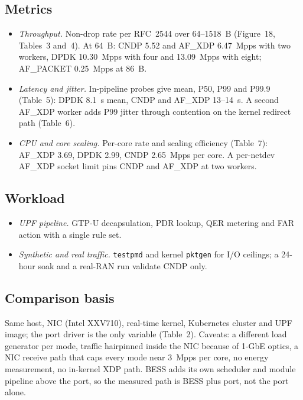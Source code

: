 \documentclass[11pt,a4paper]{article}
\begin{document}
\subsection*{\normalsize\normalfont Metrics}
\begin{itemize}
\setlength{\itemsep}{2pt}
\item \emph{Throughput.}
Non-drop rate per RFC~2544 over 64--1518~B (Figure~18, Tables~3 and~4).
At 64~B: CNDP 5.52 and AF\_XDP 6.47~Mpps with two workers, DPDK 10.30~Mpps with four and 13.09~Mpps with eight; AF\_PACKET 0.25~Mpps at 86~B.
\item \emph{Latency and jitter.}
In-pipeline probes give mean, P50, P99 and P99.9 (Table~5): DPDK 8.1~\textmu s mean, CNDP and AF\_XDP 13--14~\textmu s.
A second AF\_XDP worker adds P99 jitter through contention on the kernel redirect path (Table~6).
\item \emph{CPU and core scaling.}
Per-core rate and scaling efficiency (Table~7): AF\_XDP 3.69, DPDK 2.99, CNDP 2.65~Mpps per core.
A per-netdev AF\_XDP socket limit pins CNDP and AF\_XDP at two workers.
\end{itemize}

\subsection*{\normalsize\normalfont Workload}
\begin{itemize}
\setlength{\itemsep}{2pt}
\item \emph{UPF pipeline.}
GTP-U decapsulation, PDR lookup, QER metering and FAR action with a single rule set.
\item \emph{Synthetic and real traffic.}
\texttt{testpmd} and kernel \texttt{pktgen} for I/O ceilings; a 24-hour soak and a real-RAN run validate CNDP only.
\end{itemize}

\subsection*{\normalsize\normalfont Comparison basis}
Same host, NIC (Intel XXV710), real-time kernel, Kubernetes cluster and UPF image; the port driver is the only variable (Table~2).
Caveats: a different load generator per mode, traffic hairpinned inside the NIC because of 1-GbE optics, a NIC receive path that caps every mode near 3~Mpps per core, no energy measurement, no in-kernel XDP path.
BESS adds its own scheduler and module pipeline above the port, so the measured path is BESS plus port, not the port alone.
\par
\endgroup
\end{document}
